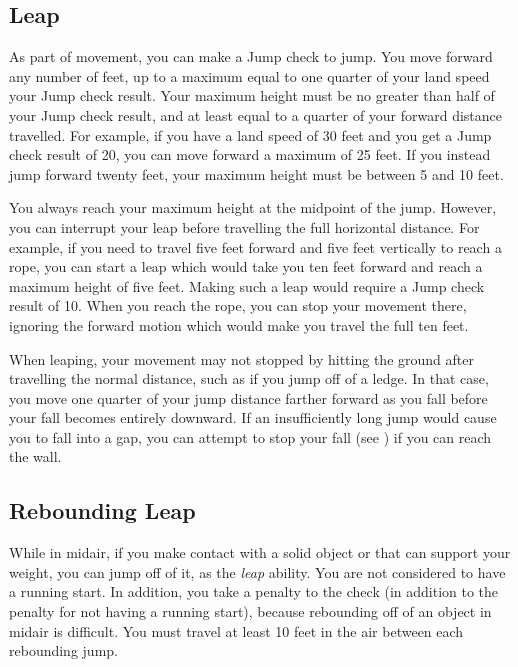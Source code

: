     \subsection{Leap}\label{Leap}
        As part of movement, you can make a Jump check to jump.
        You move forward any number of feet, up to a maximum equal to one quarter of your land speed \add your Jump check result.
        Your maximum height must be no greater than half of your Jump check result, and at least equal to a quarter of your forward distance travelled.
        For example, if you have a land speed of 30 feet and you get a Jump check result of 20, you can move forward a maximum of 25 feet.
        If you instead jump forward twenty feet, your maximum height must be between 5 and 10 feet.

        You always reach your maximum height at the midpoint of the jump.
        However, you can interrupt your leap before travelling the full horizontal distance.
        For example, if you need to travel five feet forward and five feet vertically to reach a rope, you can start a leap which would take you ten feet forward and reach a maximum height of five feet.
        Making such a leap would require a Jump check result of 10.
        When you reach the rope, you can stop your movement there, ignoring the forward motion which would make you travel the full ten feet.

        When leaping, your movement may not stopped by hitting the ground after travelling the normal distance, such as if you jump off of a ledge.
        In that case, you move one quarter of your jump distance farther forward as you fall before your fall becomes entirely downward.
        If an insufficiently long jump would cause you to fall into a gap, you can attempt to stop your fall (see ) if you can reach the wall.

    \subsection{Rebounding Leap}\label{Rebounding Leap}
        While in midair, if you make contact with a solid object or  that can support your weight, you can jump off of it, as the \textit{leap} ability.
        You are not considered to have a running start.
        In addition, you take a  penalty to the check (in addition to the penalty for not having a running start), because rebounding off of an object in midair is difficult.
        You must travel at least 10 feet in the air between each rebounding jump.


